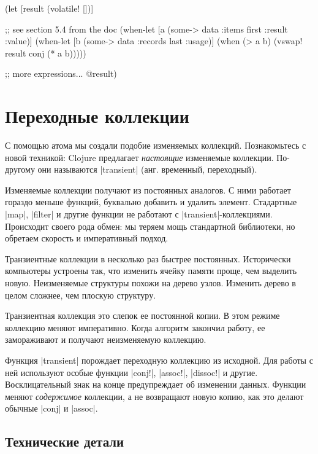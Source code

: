\begin{english}
  \begin{clojure}
(let [result (volatile! [])]

  ;; see section 5.4 from the doc
  (when-let [a (some-> data :items first :result :value)]
    (when-let [b (some-> data :records last :usage)]
      (when (> a b)
        (vswap! result conj (* a b)))))

  ;; more expressions...
  @result)
  \end{clojure}
\end{english}

\section{Переходные коллекции}

С помощью атома мы создали подобие изменяемых коллекций. Познакомьтесь с новой
техникой: Clojure предлагает \emph{настоящие} изменяемые коллекции. По-другому
они называются \spverb|transient| (анг. временный, переходный).

Изменяемые коллекции получают из постоянных аналогов. С ними работает гораздо
меньше функций, буквально добавить и удалить элемент. Стадартные \spverb|map|,
\spverb|filter| и другие функции не работают с \spverb|transient|-коллекциями.
Происходит своего рода обмен: мы теряем мощь стандартной библиотеки, но обретаем
скорость и императивный подход.

Транзиентные коллекции в несколько раз быстрее постоянных. Исторически
компьютеры устроены так, что изменить ячейку памяти проще, чем выделить
новую. Неизменяемые структуры похожи на дерево узлов. Изменить дерево в целом
сложнее, чем плоскую структуру.

Транзиентная коллекция это слепок ее постоянной копии. В этом режиме коллекцию
меняют императивно. Когда алгоритм закончил работу, ее замораживают и получают
неизменяемую коллекцию.

Функция \spverb|transient| порождает переходную коллекцию из исходной. Для
работы с ней используют особые функции \spverb|conj!|, \spverb|assoc!|,
\spverb|dissoc!| и другие. Восклицательный знак на конце предупреждает об
изменении данных. Функции меняют \emph{содержимое} коллекции, а не возвращают
новую копию, как это делают обычные \spverb|conj| и \spverb|assoc|.

\subsection{Технические детали}


